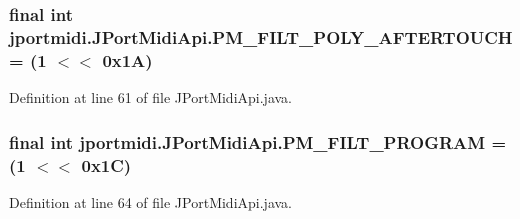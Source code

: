 \subsubsection[{\texorpdfstring{P\+M\+\_\+\+F\+I\+L\+T\+\_\+\+P\+O\+L\+Y\+\_\+\+A\+F\+T\+E\+R\+T\+O\+U\+CH}{PM_FILT_POLY_AFTERTOUCH}}]{\setlength{\rightskip}{0pt plus 5cm}final {\bf int} jportmidi.\+J\+Port\+Midi\+Api.\+P\+M\+\_\+\+F\+I\+L\+T\+\_\+\+P\+O\+L\+Y\+\_\+\+A\+F\+T\+E\+R\+T\+O\+U\+CH = (1 $<$$<$ 0x1\+A)\hspace{0.3cm}{\ttfamily [static]}}\hypertarget{classjportmidi_1_1_j_port_midi_api_a4fa4256dcbf1253c1c0907cf4d90c5e9}{}\label{classjportmidi_1_1_j_port_midi_api_a4fa4256dcbf1253c1c0907cf4d90c5e9}


Definition at line 61 of file J\+Port\+Midi\+Api.\+java.

\subsubsection[{\texorpdfstring{P\+M\+\_\+\+F\+I\+L\+T\+\_\+\+P\+R\+O\+G\+R\+AM}{PM_FILT_PROGRAM}}]{\setlength{\rightskip}{0pt plus 5cm}final {\bf int} jportmidi.\+J\+Port\+Midi\+Api.\+P\+M\+\_\+\+F\+I\+L\+T\+\_\+\+P\+R\+O\+G\+R\+AM = (1 $<$$<$ 0x1\+C)\hspace{0.3cm}{\ttfamily [static]}}\hypertarget{classjportmidi_1_1_j_port_midi_api_a492554536a39aef44801661c57530215}{}\label{classjportmidi_1_1_j_port_midi_api_a492554536a39aef44801661c57530215}


Definition at line 64 of file J\+Port\+Midi\+Api.\+java.

